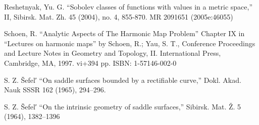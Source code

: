 \documentclass[a4paper,10pt]{amsart}
\begin{document}
\begin{thebibliography}{52}
Reshetnyak, Yu. G. ``Sobolev classes of functions with values in a metric space,'' II, Sibirsk. Mat. Zh. 45 (2004), no. 4, 855-870. MR 2091651 (2005e:46055)

Schoen, R. ``Analytic Aspects of The Harmonic Map Problem'' Chapter IX in  
``Lectures on harmonic maps'' by Schoen, R.; Yau, S. T.,  
Conference Proceedings and Lecture Notes in Geometry and Topology, II. International Press, Cambridge, MA, 1997. vi+394 pp. ISBN: 1-57146-002-0

 S. Z. \v{S}efel′ ``On saddle surfaces bounded by a rectifiable curve,'' Dokl. Akad. Nauk SSSR 162 (1965), 294--296.

 S. Z. \v{S}efel′ ``On the intrinsic geometry of saddle surfaces,'' Sibirsk. Mat. Ž. 5 (1964), 1382--1396



\end{thebibliography}
\end{document}
